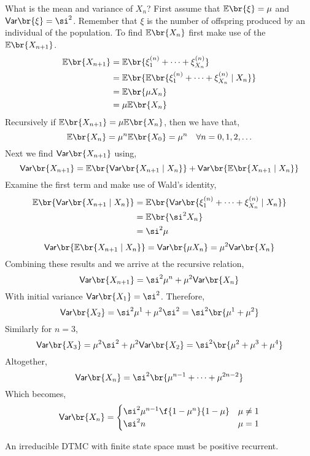 \documentclass{article}
\newcommand{\Var}{\textsf{Var}}
\newcommand{\Exp}{\mathbb{E}}
\begin{document}
    What is the mean and variance of $X_n$? First assume that $\Exp\br{\xi} = \mu$ and $\Var\br{\xi} = \si^2$. Remember that $\xi$ is the number of offspring produced by an individual of the population. To find $\Exp\br{X_n}$ first make use of the $\Exp\br{X_{n+1}}$.
    \begin{align*}
    \Exp\br{X_{n+1}}
    &= \Exp\br{\xi^{(n)}_1 + \cdots + \xi^{(n)}_{X_n}}\\
    &= \Exp\br{\Exp\br{\xi^{(n)}_1 + \cdots + \xi^{(n)}_{X_n}\mid X_n}}\\
    &= \Exp\br{\mu X_n}\\
    &= \mu \Exp\br{X_n}
    \end{align*}
    Recursively if $\Exp\br{X_{n+1}} = \mu \Exp\br{X_n}$, then we have that,
    \[ \Exp\br{X_n} = \mu^n \Exp\br{X_0} = \mu^n  \quad \forall n = 0, 1, 2, \ldots \]
    Next we find $\Var\br{X_{n+1}}$ using,
    \[ \Var\br{X_{n+1}} = \Exp\br{\Var\br{X_{n+1} \mid X_n}} + \Var\br{\Exp\br{X_{n+1} \mid X_n}} \]
    Examine the first term and make use of Wald's identity,
    \begin{align*}
        \Exp\br{\Var\br{X_{n+1} \mid X_n}}
        &= \Exp\br{\Var\br{\xi^{(n)}_1 + \cdots + \xi^{(n)}_{X_n} \mid X_n}} \\
        &= \Exp\br{\si^2 X_n} \\
        &= \si^2 \mu
    \end{align*}
    \[ \Var\br{\Exp\br{X_{n+1} \mid X_n}} = \Var\br{\mu X_n} = \mu^2 \Var\br{X_n} \]
    Combining these results and we arrive at the recursive relation,
    \[ \Var\br{X_{n+1}} = \si^2 \mu^n + \mu^2 \Var\br{X_n} \]
    With initial variance $\Var\br{X_1} = \si^2$. Therefore,
    \[ \Var\br{X_2} = \si^2 \mu^1 + \mu^2 \si^2 = \si^2 \br{\mu^1 + \mu^2} \]
    Similarly for $n = 3$,
    \[ \Var\br{X_3} = \mu^2 \si^2  + \mu^2 \Var\br{X_2} = \si^2 \br{\mu^2 + \mu^3 + \mu^4} \]
    Altogether,
    \[ \Var\br{X_n} = \si^2 \br{\mu^{n-1} + \cdots + \mu^{2n-2}} \]
    Which becomes,
    \[ \Var\br{X_n} = \begin{cases}
        \si^2 \mu^{n-1}\f{1 - \mu^n}{1 - \mu} & \mu \neq 1 \\
        \si^2n & \mu = 1 \\
    \end{cases} \]

    \begin{theorem}
        \label{thm:finite_state_space}
        An irreducible DTMC with finite state space must be positive recurrent.
    \end{theorem}
\end{document}
